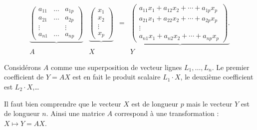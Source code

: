 \documentclass[11pt,class=report,crop=false]{standalone}
\begin{document}
\begin{equation*}
	\begin{array}{cccc}
		\underbrace{
			\left(
			\begin{array}{ccc}
				a_{11} & \dots & a_{1p}\\
				a_{21} & \dots & a_{2p}\\
				\vdots &&\vdots\\
				a_{n1} &\dots & a_{np}
			\end{array}
			\right)
		}
		&
		\underbrace{
			\left(
			\begin{array}{c}
				x_1\\
				x_2\\
				\vdots\\
				x_p
			\end{array}
			\right)
		}
		& = &
		\underbrace{
			\left(
			\begin{array}{c}
				a_{11}x_1+a_{12}x_2+\cdots + a_{1p}x_p \\
				a_{21}x_1+a_{22}x_2+\cdots + a_{2p}x_p \\
				\vdots\\
				a_{n1}x_1+a_{n2}x_2+\cdots + a_{np}x_p 
			\end{array}
			\right).
		}
		\\
		A & X & &Y
\end{array}\end{equation*}

Considérons $A$ comme une superposition de vecteur lignes $L_1,\ldots,L_n$.
Le premier coefficient de $Y=AX$ est en fait le produit scalaire $L_1 \cdot X$, le deuxième coefficient est $L_2 \cdot X$,\ldots{}



Il faut bien comprendre que le vecteur $X$ est de longueur $p$ mais le vecteur $Y$ est de longueur $n$.
Ainsi une matrice $A$ correspond à une transformation : $X \mapsto Y = AX$.
\end{document}
